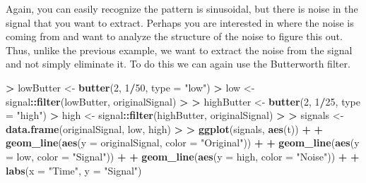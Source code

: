 \documentclass[
]{krantz}
\makeatletter
\newenvironment{Shaded}{\begin{snugshade}}{\end{snugshade}}
\newcommand{\DataTypeTok}[1]{\textcolor[rgb]{0.27,0.27,0.27}{#1}}
\newcommand{\DecValTok}[1]{\textcolor[rgb]{0.06,0.06,0.06}{#1}}
\newcommand{\ErrorTok}[1]{\textcolor[rgb]{0.14,0.14,0.14}{\textbf{#1}}}
\newcommand{\KeywordTok}[1]{\textcolor[rgb]{0.27,0.27,0.27}{\textbf{#1}}}
\newcommand{\NormalTok}[1]{#1}
\newcommand{\OperatorTok}[1]{\textcolor[rgb]{0.43,0.43,0.43}{\textbf{#1}}}
\newcommand{\StringTok}[1]{\textcolor[rgb]{0.5,0.5,0.5}{#1}}
\newenvironment{kframe}{%
\medskip{}
\setlength{\fboxsep}{.8em}
 \def\at@end@of@kframe{}%
 \ifinner\ifhmode%
  \def\at@end@of@kframe{\end{minipage}}%
  \begin{minipage}{\columnwidth}%
 \fi\fi%
 \def\FrameCommand##1{\hskip\@totalleftmargin \hskip-\fboxsep
 \colorbox{shadecolor}{##1}\hskip-\fboxsep
     \hskip-\linewidth \hskip-\@totalleftmargin \hskip\columnwidth}%
 \MakeFramed {\advance\hsize-\width
   \@totalleftmargin\z@ \linewidth\hsize
   \@setminipage}}%
 {\par\unskip\endMakeFramed%
 \at@end@of@kframe}
\renewenvironment{Shaded}{\begin{kframe}}{\end{kframe}}
\makeatother
\begin{document}
Again, you can easily recognize the pattern is sinusoidal, but there is noise in the signal that you want to extract. Perhaps you are interested in where the noise is coming from and want to analyze the structure of the noise to figure this out. Thus, unlike the previous example, we want to extract the noise from the signal and not simply eliminate it. To do this we can again use the Butterworth filter.

\begin{Shaded}
\begin{Highlighting}[]
\OperatorTok{\textgreater{}}\StringTok{ }\NormalTok{lowButter \textless{}{-}}\StringTok{ }\KeywordTok{butter}\NormalTok{(}\DecValTok{2}\NormalTok{, }\DecValTok{1}\OperatorTok{/}\DecValTok{50}\NormalTok{, }\DataTypeTok{type =} \StringTok{"low"}\NormalTok{)}
\OperatorTok{\textgreater{}}\StringTok{ }\NormalTok{low \textless{}{-}}\StringTok{ }\NormalTok{signal}\OperatorTok{::}\KeywordTok{filter}\NormalTok{(lowButter, originalSignal)}
\OperatorTok{\textgreater{}}\StringTok{ }
\ErrorTok{\textgreater{}}\StringTok{ }\NormalTok{highButter \textless{}{-}}\StringTok{ }\KeywordTok{butter}\NormalTok{(}\DecValTok{2}\NormalTok{, }\DecValTok{1}\OperatorTok{/}\DecValTok{25}\NormalTok{, }\DataTypeTok{type =} \StringTok{"high"}\NormalTok{)}
\OperatorTok{\textgreater{}}\StringTok{ }\NormalTok{high \textless{}{-}}\StringTok{ }\NormalTok{signal}\OperatorTok{::}\KeywordTok{filter}\NormalTok{(highButter, originalSignal)}
\OperatorTok{\textgreater{}}\StringTok{ }
\ErrorTok{\textgreater{}}\StringTok{ }\NormalTok{signals \textless{}{-}}\StringTok{ }\KeywordTok{data.frame}\NormalTok{(originalSignal, low, high)}
\OperatorTok{\textgreater{}}\StringTok{ }
\ErrorTok{\textgreater{}}\StringTok{ }\KeywordTok{ggplot}\NormalTok{(signals, }\KeywordTok{aes}\NormalTok{(t)) }\OperatorTok{+}\StringTok{ }
\OperatorTok{+}\StringTok{   }\KeywordTok{geom\_line}\NormalTok{(}\KeywordTok{aes}\NormalTok{(}\DataTypeTok{y =}\NormalTok{ originalSignal, }\DataTypeTok{color =} \StringTok{"Original"}\NormalTok{)) }\OperatorTok{+}\StringTok{ }
\OperatorTok{+}\StringTok{   }\KeywordTok{geom\_line}\NormalTok{(}\KeywordTok{aes}\NormalTok{(}\DataTypeTok{y =}\NormalTok{ low, }\DataTypeTok{color =} \StringTok{"Signal"}\NormalTok{)) }\OperatorTok{+}\StringTok{ }
\OperatorTok{+}\StringTok{   }\KeywordTok{geom\_line}\NormalTok{(}\KeywordTok{aes}\NormalTok{(}\DataTypeTok{y =}\NormalTok{ high, }\DataTypeTok{color =} \StringTok{"Noise"}\NormalTok{)) }\OperatorTok{+}\StringTok{ }
\OperatorTok{+}\StringTok{   }\KeywordTok{labs}\NormalTok{(}\DataTypeTok{x =} \StringTok{"Time"}\NormalTok{, }\DataTypeTok{y =} \StringTok{"Signal"}\NormalTok{)}
\end{Highlighting}
\end{Shaded}
\end{document}
